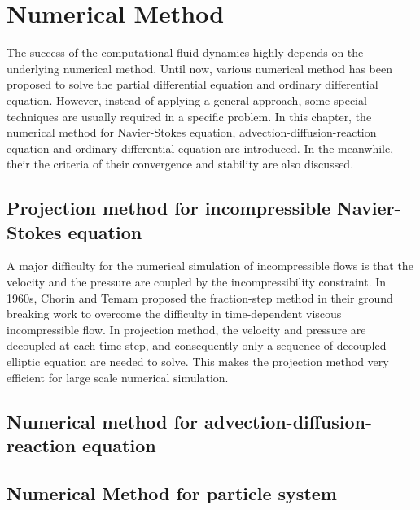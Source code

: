 \chapter{Numerical Method}
The success of the computational fluid dynamics highly depends on the underlying numerical method. Until now, various numerical method has been proposed to solve the partial differential equation and ordinary differential equation. However, instead of applying a general approach, some special techniques are usually required in a specific problem. In this chapter, the numerical method for Navier-Stokes equation, advection-diffusion-reaction equation and ordinary differential equation are introduced. In the meanwhile, their the criteria of their convergence and stability are also discussed.

\section{Projection method for incompressible Navier-Stokes equation}
A major difficulty for the numerical simulation of incompressible flows is that the velocity and the pressure are coupled by the incompressibility constraint. In 1960s, Chorin and Temam proposed the fraction-step method in their ground breaking work \cite{} to overcome the difficulty in time-dependent viscous incompressible flow. In projection method, the velocity and pressure are decoupled at each time step, and consequently only a sequence of decoupled elliptic equation are needed to solve. This makes the projection method very efficient for large scale numerical simulation.
\section{Numerical method for advection-diffusion-reaction equation}

\section{Numerical Method for particle system}
